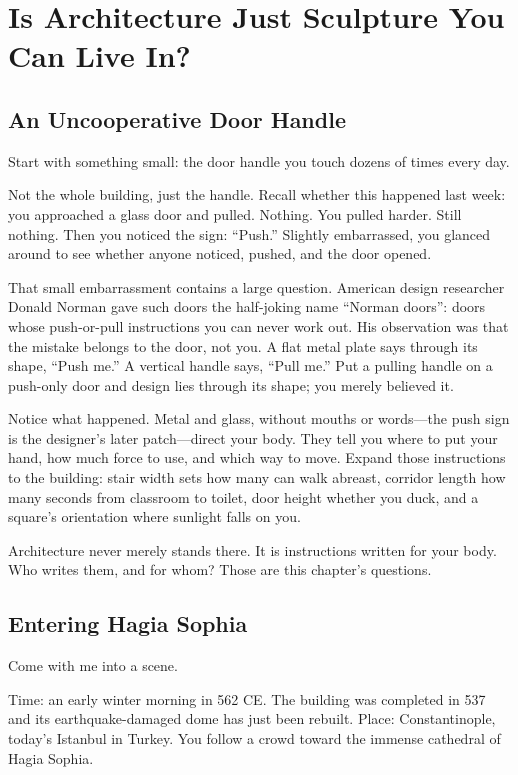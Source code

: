 \chapter[Architecture: Habitable Sculpture?]{Is Architecture Just Sculpture You Can Live In?}
\section{An Uncooperative Door Handle}
Start with something small: the door handle you touch dozens of times every day.

Not the whole building, just the handle. Recall whether this happened last week: you approached a glass door and pulled. Nothing. You pulled harder. Still nothing. Then you noticed the sign: ``Push.'' Slightly embarrassed, you glanced around to see whether anyone noticed, pushed, and the door opened.

That small embarrassment contains a large question. American design researcher Donald Norman gave such doors the half-joking name ``Norman doors'': doors whose push-or-pull instructions you can never work out. His observation was that the mistake belongs to the door, not you. A flat metal plate says through its shape, ``Push me.'' A vertical handle says, ``Pull me.'' Put a pulling handle on a push-only door and design lies through its shape; you merely believed it.

Notice what happened. Metal and glass, without mouths or words---the push sign is the designer's later patch---direct your body. They tell you where to put your hand, how much force to use, and which way to move. Expand those instructions to the building: stair width sets how many can walk abreast, corridor length how many seconds from classroom to toilet, door height whether you duck, and a square's orientation where sunlight falls on you.

Architecture never merely stands there. It is instructions written for your body. Who writes them, and for whom? Those are this chapter's questions.

\section{Entering Hagia Sophia}
Come with me into a scene.

Time: an early winter morning in 562 CE. The building was completed in 537 and its earthquake-damaged dome has just been rebuilt. Place: Constantinople, today's Istanbul in Turkey. You follow a crowd toward the immense cathedral of Hagia Sophia.

